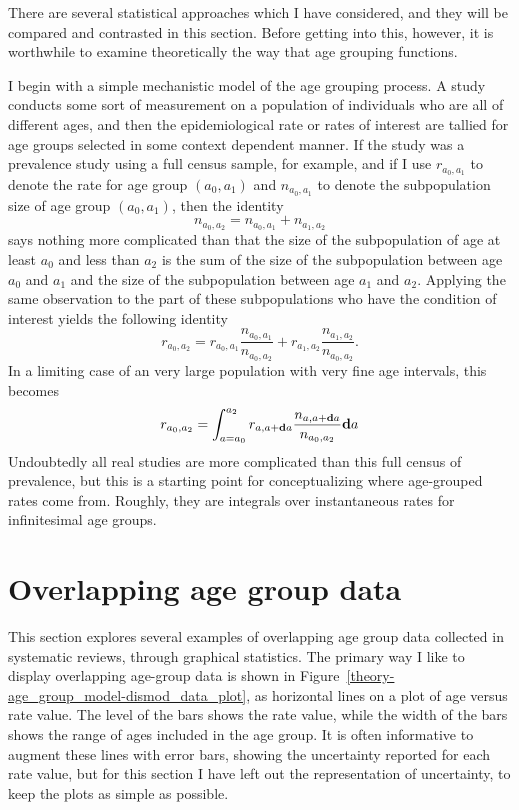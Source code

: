 There are several statistical approaches which I have considered, and
they will be compared and contrasted in this section.  Before getting
into this, however, it is worthwhile to examine theoretically
the way that age grouping functions.

I begin with a simple mechanistic model of the age grouping process.
A study conducts some sort of measurement on a population of
individuals who are all of different ages, and then the
epidemiological rate or rates of interest are tallied for age groups
selected in some context dependent manner. If the study was a
prevalence study using a full census sample, for example, and if I use
$r_{a_0,a_1}$ to denote the rate for age group $(a_0, a_1)$ and
$n_{a_0,a_1}$ to denote the subpopulation size of age group
$(a_0,a_1)$, then the identity
\[
n_{a_0, a_2} = n_{a_0,a_1} + n_{a_1,a_2}
\]
says nothing more complicated than that the size of the subpopulation
of age at least $a_0$ and less than $a_2$ is the sum of the size of
the subpopulation between age $a_0$ and $a_1$ and the size of the
subpopulation between age $a_1$ and $a_2$.  Applying the same
observation to the part of these subpopulations who have the condition
of interest yields the following identity
\[
r_{a_0,a_2} = r_{a_0,a_1}\frac{n_{a_0,a_1}}{n_{a_0,a_2}} + r_{a_1,a_2}\frac{n_{a_1,a_2}}{n_{a_0,a_2}}. 
\] 
In a limiting case of an very large population with very fine age
intervals, this becomes
\[
r_{a_0,a_2} = \int_{a=a_0}^{a_2} r_{a,a+\mathbf{d} a}\frac{n_{a,a+\mathbf{d} a}}{n_{a_0,a_2}}\mathbf{d} a
\]
Undoubtedly all real studies are more complicated than this full
census of prevalence, but this is a starting point for conceptualizing
where age-grouped rates come from.  Roughly, they are integrals over
instantaneous rates for infinitesimal age groups.

\section{Overlapping age group data}
\label{theory-age_group_model-overlapping_data}
This section explores several examples of overlapping age group data
collected in systematic reviews, through graphical statistics.  The
primary way I like to display overlapping age-group data is shown in
Figure~\ref{theory-age_group_model-dismod_data_plot}, as horizontal
lines on a plot of age versus rate value.  The level of the bars shows
the rate value, while the width of the bars shows the range of ages
included in the age group. It is often informative to augment these
lines with error bars, showing the uncertainty reported for each rate
value, but for this section I have left out the representation of
uncertainty, to keep the plots as simple as possible.

